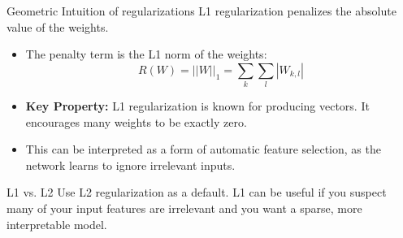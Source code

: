 \begin{frame}{Geometric Intuition of regularizations}
    L1 regularization penalizes the absolute value of the weights.
    \begin{itemize}
        \item The penalty term is the L1 norm of the weights:
            $$ R(W) = ||W||_1 = \sum_k \sum_l |W_{k,l}| $$
        \item \textbf{Key Property:} L1 regularization is known for producing  vectors. It encourages many weights to be exactly zero.
        \item This can be interpreted as a form of automatic feature selection, as the network learns to ignore irrelevant inputs.
    \end{itemize}
    \begin{alertblock}{L1 vs. L2}
        Use L2 regularization as a default. L1 can be useful if you suspect many of your input features are irrelevant and you want a sparse, more interpretable model.
    \end{alertblock}
\end{frame}

